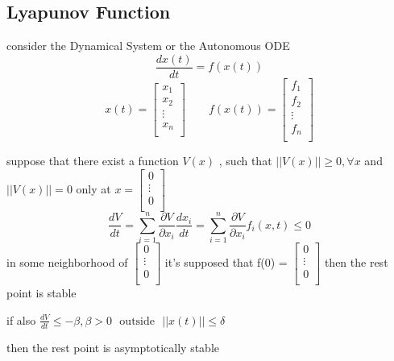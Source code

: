 \documentclass[]{article}
\begin{document}
\subsection{Lyapunov Function}
consider the Dynamical System or the Autonomous ODE
\[
\frac{dx(t)}{dt} = f(x(t))
\]
\[
x(t) = \begin{bmatrix}
    x_{1}\\
    x_{2}\\
    \vdots\\
    x_{n}\\
\end{bmatrix}
\qquad
f(x(t)) = \begin{bmatrix}
    f_{1}\\
    f_{2}\\
    \vdots\\
    f_{n}\\
\end{bmatrix}
\]
\begin{theorem}
    suppose that there exist a function $V(x)$ , such that $||V(x)|| \geq 0 , \forall x$ and $||V(x)|| = 0$ only at $x = \begin{bmatrix}
        0\\
        \vdots\\
        0\\
    \end{bmatrix}$
    \[
    \frac{dV}{dt} = \sum_{i=1}^{n} \frac{\partial V}{\partial x_i}\frac{d x_i}{dt}
                            = \sum_{i=1}^{n} \frac{\partial V}{\partial x_i} f_i(x,t) \leq 0
    \]    
    in some neighborhood of $\begin{bmatrix}
        0\\
        \vdots\\
        0\\
    \end{bmatrix}$
    it's supposed that f(0) = $\begin{bmatrix}
        0\\
        \vdots\\
        0\\
    \end{bmatrix}$ then the rest point is stable 

    if also $\displaystyle \frac{dV}{dt} \leq -\beta ,  \beta > 0 \ \ \ \text{outside} \ \ \ ||x(t)|| \leq \delta $ 

    then the rest point is asymptotically stable 
\end{theorem}
\end{document}
